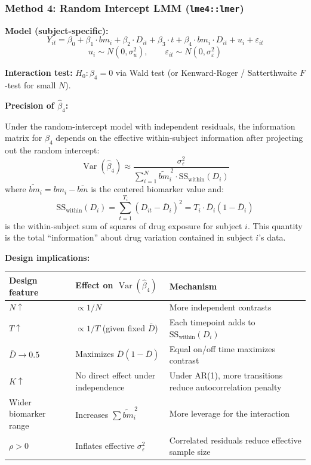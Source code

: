 \documentclass[11pt]{article}
\begin{document}
\subsubsection{Method 4: Random Intercept LMM (\texttt{lme4::lmer})}

\textbf{Model (subject-specific):}
\[
Y_{it} = \beta_0 + \beta_1 \cdot bm_i + \beta_2 \cdot D_{it}
+ \beta_3 \cdot t + \beta_4 \cdot bm_i \cdot D_{it}
+ u_i + \varepsilon_{it}
\]
\[
u_i \sim N(0, \sigma^2_u), \qquad
\varepsilon_{it} \sim N(0, \sigma^2_\varepsilon)
\]

\textbf{Interaction test:} $H_0: \beta_4 = 0$ via Wald test (or
Kenward-Roger / Satterthwaite $F$-test for small $N$).

\textbf{Precision of $\hat{\beta}_4$:}

Under the random-intercept model with independent residuals, the
information matrix for $\beta_4$ depends on the effective within-subject
information after projecting out the random intercept:
\[
\operatorname{Var}(\hat{\beta}_4) \approx
\frac{\sigma^2_\varepsilon}{
\displaystyle\sum_{i=1}^{N} \widetilde{bm}_i^{\,2} \cdot
\text{SS}_{\text{within}}(D_i)}
\]
where $\widetilde{bm}_i = bm_i - \overline{bm}$ is the centered
biomarker value and:
\[
\text{SS}_{\text{within}}(D_i) =
\sum_{t=1}^{T_i} (D_{it} - \bar{D}_i)^2
= T_i \cdot \bar{D}_i (1 - \bar{D}_i)
\]
is the within-subject sum of squares of drug exposure for subject $i$.
This quantity is the total ``information'' about drug variation contained
in subject $i$'s data.

\textbf{Design implications:}

\begin{table}[h]
\centering\small
\begin{tabular}{@{}L{3.5cm}L{4.5cm}L{5.5cm}@{}}
\toprule
Design feature & Effect on $\operatorname{Var}(\hat{\beta}_4)$ & Mechanism \\
\midrule
$N \uparrow$ & $\propto 1/N$ & More independent contrasts \\
$T \uparrow$ & $\propto 1/T$ (given fixed $\bar{D}$) & Each timepoint adds to $\text{SS}_{\text{within}}(D_i)$ \\
$\bar{D} \to 0.5$ & Maximizes $\bar{D}(1-\bar{D})$ & Equal on/off time maximizes contrast \\
$K \uparrow$ & No direct effect under independence & Under AR(1), more transitions reduce autocorrelation penalty \\
Wider biomarker range & Increases $\sum \widetilde{bm}_i^{\,2}$ & More leverage for the interaction \\
$\rho > 0$ & Inflates effective $\sigma^2_\varepsilon$ & Correlated residuals reduce effective sample size \\
\bottomrule
\end{tabular}
\end{table}
\end{document}
